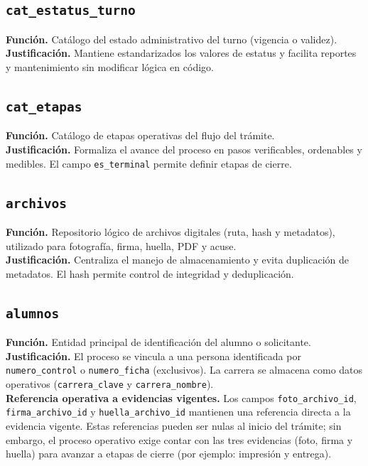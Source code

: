 \documentclass[12pt,a4paper]{article}
\begin{document}
\subsection{\texttt{cat\_estatus\_turno}}
\textbf{Función.} Catálogo del estado administrativo del turno (vigencia o validez).\\
\textbf{Justificación.} Mantiene estandarizados los valores de estatus y facilita reportes y mantenimiento sin modificar lógica en código.

\subsection{\texttt{cat\_etapas}}
\textbf{Función.} Catálogo de etapas operativas del flujo del trámite.\\
\textbf{Justificación.} Formaliza el avance del proceso en pasos verificables, ordenables y medibles. El campo \texttt{es\_terminal} permite definir etapas de cierre.

\subsection{\texttt{archivos}}
\textbf{Función.} Repositorio lógico de archivos digitales (ruta, hash y metadatos), utilizado para fotografía, firma, huella, PDF y acuse.\\
\textbf{Justificación.} Centraliza el manejo de almacenamiento y evita duplicación de metadatos. El hash permite control de integridad y deduplicación.

\subsection{\texttt{alumnos}}
\textbf{Función.} Entidad principal de identificación del alumno o solicitante.\\
\textbf{Justificación.} El proceso se vincula a una persona identificada por \texttt{numero\_control} o \texttt{numero\_ficha} (exclusivos). La carrera se almacena como datos operativos (\texttt{carrera\_clave} y \texttt{carrera\_nombre}).\\
\textbf{Referencia operativa a evidencias vigentes.} Los campos \texttt{foto\_archivo\_id}, \texttt{firma\_archivo\_id} y \texttt{huella\_archivo\_id} mantienen una referencia directa a la evidencia vigente. Estas referencias pueden ser nulas al inicio del trámite; sin embargo, el proceso operativo exige contar con las tres evidencias (foto, firma y huella) para avanzar a etapas de cierre (por ejemplo: impresión y entrega).
\end{document}
